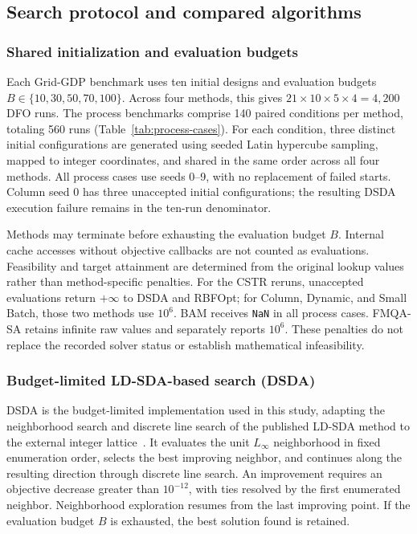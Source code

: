 \documentclass{article}
\begin{document}
\subsection{Search protocol and compared algorithms}

\subsubsection{Shared initialization and evaluation budgets}
Each Grid-GDP benchmark uses ten initial designs and evaluation budgets \(B\in\{10,30,50,70,100\}\). Across four methods, this gives \(21\times10\times5\times4=4{,}200\) DFO runs.
The process benchmarks comprise 140 paired conditions per method, totaling 560 runs (Table~\ref{tab:process-cases}).
For each condition, three distinct initial configurations are generated using seeded Latin hypercube sampling, mapped to integer coordinates, and shared in the same order across all four methods.
All process cases use seeds 0--9, with no replacement of failed starts. Column seed 0 has three unaccepted initial configurations; the resulting DSDA execution failure remains in the ten-run denominator.

Methods may terminate before exhausting the evaluation budget \(B\).
Internal cache accesses without objective callbacks are not counted as evaluations.
Feasibility and target attainment are determined from the original lookup values rather than method-specific penalties.
For the CSTR reruns, unaccepted evaluations return $+\infty$ to DSDA and RBFOpt; for Column, Dynamic, and Small Batch, those two methods use $10^6$. BAM receives \texttt{NaN} in all process cases. FMQA-SA retains infinite raw values and separately reports $10^6$. These penalties do not replace the recorded solver status or establish mathematical infeasibility.

\subsubsection{Budget-limited LD-SDA-based search (DSDA)}
DSDA is the budget-limited implementation used in this study, adapting the neighborhood search and discrete line search of the published LD-SDA method to the external integer lattice~\cite{ovalle2025logic}.
It evaluates the unit $L_\infty$ neighborhood in fixed enumeration order, selects the best improving neighbor, and continues along the resulting direction through discrete line search.
An improvement requires an objective decrease greater than $10^{-12}$, with ties resolved by the first enumerated neighbor.
Neighborhood exploration resumes from the last improving point.
If the evaluation budget $B$ is exhausted, the best solution found is retained.
\end{document}
